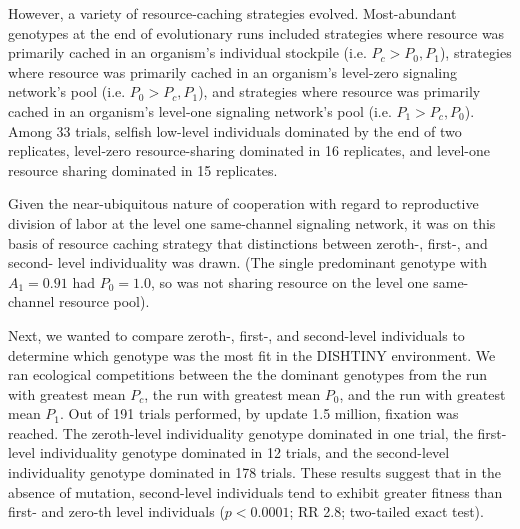 However, a variety of resource-caching strategies evolved.
Most-abundant genotypes at the end of evolutionary runs included strategies where resource was primarily cached in an organism's individual stockpile (i.e. $P_{c} > P_0, P_1$), strategies where resource was primarily cached in an organism's level-zero signaling network's pool (i.e. $P_0 > P_{c}, P_1$), and strategies where resource was primarily cached in an organism's level-one signaling network's pool (i.e. $P_1 > P_{c}, P_0$).
Among 33 trials, selfish low-level individuals dominated by the end of two replicates, level-zero resource-sharing dominated in 16 replicates, and level-one resource sharing dominated in 15 replicates.

Given the near-ubiquitous nature of cooperation with regard to reproductive division of labor at the level one same-channel signaling network, it was on this basis of resource caching strategy that distinctions between zeroth-, first-, and second- level individuality was drawn.
(The single predominant genotype with $A_1 = 0.91$ had $P_0 = 1.0$, so was not sharing resource on the level one same-channel resource pool).

Next, we wanted to compare zeroth-, first-, and second-level individuals to determine which genotype was the most fit in the DISHTINY environment.
We ran ecological competitions between the the dominant genotypes from the run with greatest mean $P_{c}$, the run with greatest mean $P_0$, and the run with greatest mean $P_1$.
Out of 191 trials performed, by update 1.5 million, fixation was reached.  %
The zeroth-level individuality genotype dominated in one trial, the first-level individuality genotype dominated in 12 trials, and the second-level individuality genotype dominated in 178 trials.
These results suggest that in the absence of mutation, second-level individuals tend to exhibit greater fitness than first- and zero-th level individuals ($p < 0.0001$; RR 2.8; two-tailed exact test).

